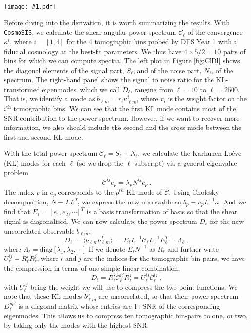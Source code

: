 \documentclass[aps, prd, twocolumn, superscriptaddress, nofootinbib, amssymb, amsmath]{revtex4-2}
\newcommand{\sfig}[3]{
	\texttt{[image: \#1.pdf]}
	\caption{#3}
	\label{fig:#1}
}
\newcommand{\rf}[1]{Figure \ref{fig:#1}}
\newcommand\be{\begin{equation}}
\newcommand\ee{\end{equation}}
\newcommand\full{the FCM}
\newcommand\ctot{\mathcal{C}}
\begin{document}
\begin{figure*}[thbp]
	\sfig{ClDl}{0.8\textwidth}
	{\textbf{Left:} Shear power spectrum of \full. Solid lines are diagonal elements of the signal matrix $S_{\ell}$, and dashed lines are the diagonal elements of noise matrix $N_{\ell}$.
		\textbf{Right:} Signal-to-noise ratio matrix $D_\ell$ of the first to fourth KL-modes of the power spectrum on the left.}
\end{figure*}

Before diving into the derivation, it is worth summarizing the results. With \texttt{CosmoSIS}, we calculate the shear angular power spectrum $\ctot_{\ell}$ of the convergence $\kappa^i$, where $i=[1,4]$ for the 4 tomographic bins probed by DES Year 1 with a fiducial cosmology at the best-fit parameters. We thus have $4\times 5/2=10$ pairs of bins for which we can compute spectra. The left plot in \rf{ClDl} shows the diagonal elements of the signal part, $S_\ell$, and of the noise part, $N_\ell$, of the spectrum. The right-hand panel shows the signal to noise ratio for the KL-transformed eigenmodes, which we call $D_{\ell}$, ranging from $\ell = 10$ to $\ell = 2500$. That is, we identify a mode as $b_{\ell m} = r_i \kappa_{\ell m}^i$, where $r_i$ is the weight factor on the $i^{\text{th}}$ tomographic bins. We can see that the first KL mode contains most of the SNR contribution to the power spectrum. However, if we want to recover more information, we also should include the second and the cross mode between the first and second KL-mode.

With the total power spectrum $\ctot_\ell = S_\ell+N_\ell$, we calculate the Karhunen-Lo\'eve (KL) modes for each $\ell$ (so we drop the $\ell$ subscript) via a general eigenvalue problem 
\be
\ctot^{ij} e_p = \lambda_p N^{ij} e_p\
.\ee
The index $p$ in $e_p$ corresponds to the $p^{th}$ KL-mode of $\ctot$. Using Cholesky decomposition, $N = L L^T$, we express the new observable as $b_p = e_p  L^{-1} \kappa$.
And we find that $E_{\ell} = [e_1, e_2, \cdots] ^T$ is a basis transformation of basis so that the shear signal is diagonalized. We can now calculate the power spectrum $D_{\ell}$ for the new uncorrelated observable $b_{\ell m}$,
\be
D_{\ell}=\ \langle b_{\ell m} b_{\ell m}^T \rangle \ = E_{\ell} L^{-1} \ctot_{\ell} L^{-1} E^{T}_{\ell} = \Lambda_{\ell}\
,\ee
where $\Lambda_{\ell} = \text{diag}[\lambda_1, \lambda_2, \cdots]$ If we denote $E_{\ell} N^{-1}$ as $R_{\ell}$ and further write $U_{\ell}^{ij}=R^i_{\ell} R^j_{\ell}$, where $i$ and $j$ are the indices for the tomographic bin-pairs, we have the compression in terms of one simple linear combination,
\be
D_{\ell} = R_{\ell}^i \ctot_{\ell}^{ij} R_{\ell}^j = U_{\ell}^{ij} \ctot_{\ell}^{ij}\
,\ee
with $U_{\ell}^{ij}$ being the weight we will use to compress the two-point functions. We note that these KL-modes $b_{\ell m}^p$ are uncorrelated, so that their power spectrum $D_{\ell}^{pp'}$ is a diagonal matrix whose entries are 1+SNR of the corresponding eigenmodes. This allows us to compress ten tomographic bin-pairs to one, or two, by taking only the modes with the highest SNR.
\end{document}
